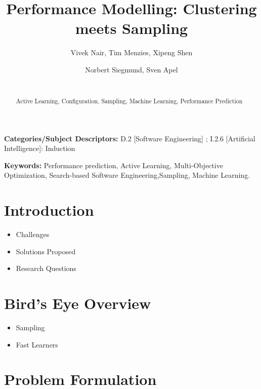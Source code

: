\documentclass{sig-alternative}
\newcommand{\bi}{\begin{itemize}[leftmargin=0.4cm]}
\newcommand{\ei}{\end{itemize}}
\begin{document}
\title{ Performance Modelling: Clustering meets Sampling}
\author{
        \alignauthor Vivek Nair, Tim Menzies, Xipeng Shen 
    \and  
        \alignauthor Norbert Siegmund, Sven Apel \\
        \\
       }

\maketitle 
\thispagestyle{plain}
\pagestyle{plain}
\begin{abstract}
Active Learning, Configuration, Sampling, Machine Learning, Performance Prediction


\end{abstract}

\vspace{1mm}
\noindent
{\bf Categories/Subject Descriptors:} 
D.2 [Software Engineering] ;
I.2.6 [Artificial Intelligence]: Induction

 
\vspace{1mm}
\noindent
{\bf Keywords:} Performance prediction, Active Learning, 
Multi-Objective Optimization,
Search-based Software Engineering,Sampling, Machine Learning.

 
 
\section{Introduction}
 
\bi
    \item{Challenges}
    \item{Solutions Proposed}
    \item{Research Questions}
\ei
\section{Bird's Eye Overview}
\bi
    \item{Sampling}
    \item{Fast Learners}
\ei

\section{Problem Formulation}
\end{document}
